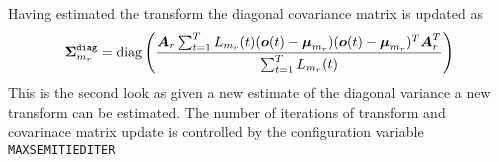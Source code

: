 Having estimated the transform the diagonal covariance matrix is updated
as
\begin{eqnarray}
{\mbox{\boldmath $\Sigma$}}^{\tt diag}_{m_r} = {\mbox{diag}}\left(\frac{
{{\mbox{\boldmath $A$}}}_r\sum_{t=1}^TL_{m_r}(t)({\mbox{\boldmath $o$}}(t)-{{\mbox{\boldmath $\mu$}}}_{m_r})
({\mbox{\boldmath $o$}}(t)-{{\mbox{\boldmath $\mu$}}}_{m_r})^T{{\mbox{\boldmath $A$}}}_r^T}
{\sum_{t=1}^TL_{m_r}(t)}
\right)
\end{eqnarray}
This is the second look as given a new estimate of the diagonal
variance a new transform can be estimated. The number of iterations
of transform and covarinace matrix update is controlled by the 
 configuration variable {\tt MAXSEMITIEDITER}






